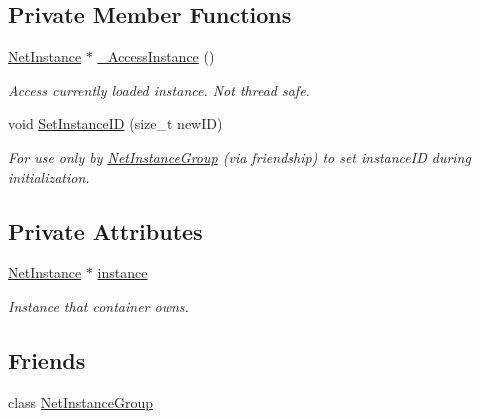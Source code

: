\subsection*{Private Member Functions}
\begin{DoxyCompactItemize}
\item 
\hyperlink{class_net_instance}{NetInstance} $\ast$ \hyperlink{class_net_instance_container_add999a784ede9aee774cb4853124830e}{\_\-AccessInstance} ()
\begin{DoxyCompactList}\small\item\em Access currently loaded instance. Not thread safe. \item\end{DoxyCompactList}\item 
void \hyperlink{class_net_instance_container_a6d80165ab3abb1fdbef2d0350b31cb95}{SetInstanceID} (size\_\-t newID)
\begin{DoxyCompactList}\small\item\em For use only by \hyperlink{class_net_instance_group}{NetInstanceGroup} (via friendship) to set instanceID during initialization. \item\end{DoxyCompactList}\end{DoxyCompactItemize}
\subsection*{Private Attributes}
\begin{DoxyCompactItemize}
\item 
\hypertarget{class_net_instance_container_a2089189c13983395ff68d1bc5fa6a690}{
\hyperlink{class_net_instance}{NetInstance} $\ast$ \hyperlink{class_net_instance_container_a2089189c13983395ff68d1bc5fa6a690}{instance}}
\label{class_net_instance_container_a2089189c13983395ff68d1bc5fa6a690}

\begin{DoxyCompactList}\small\item\em Instance that container owns. \item\end{DoxyCompactList}\end{DoxyCompactItemize}
\subsection*{Friends}
\begin{DoxyCompactItemize}
\item 
class \hyperlink{class_net_instance_container_a549e2db5e7c563d88ffc32dacc8d5a5f}{NetInstanceGroup}
\end{DoxyCompactItemize}


